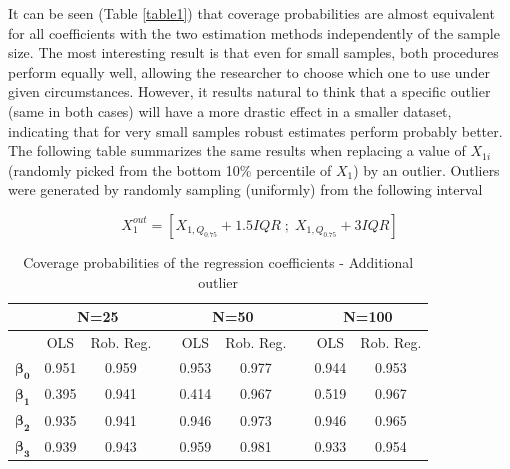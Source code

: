 \documentclass[a4paper]{article}
\begin{document}
\noindent
It can be seen (Table \ref{table1}) that coverage probabilities are almost equivalent for all coefficients with the two estimation methods independently of the sample size. The most interesting result is that even for small samples, both procedures perform equally well, allowing the researcher to choose which one to use under given circumstances. However, it results natural to think that a specific outlier (same in both cases) will have a more drastic effect in a smaller dataset, indicating that for very small samples robust estimates perform probably better. The following table summarizes the same results when replacing a value of $X_{1i}$ (randomly picked from the bottom 10\% percentile of $X_1$) by an outlier. Outliers were generated by randomly sampling (uniformly) from the following interval

\vspace{3mm}
\begin{equation*}
X_{1}^{out}=\left[X_{1,Q_{0.75}}+1.5IQR\; ; \; X_{1,Q_{0.75}}+3IQR \right]
\end{equation*}

\begin{table}[!h]
	\centering
	\caption{Coverage probabilities of the regression coefficients - Additional outlier}
	\vspace{1mm}
	\label{table2}
	\begin{tabular}{@{}ccccccccc@{}}
		\toprule
		& \multicolumn{2}{c}{N=25} & \textit{} & \multicolumn{2}{c}{N=50} & \textit{} & \multicolumn{2}{c}{N=100} \\ \midrule
		& OLS       & Rob. Reg.    & \textit{} & OLS       & Rob. Reg.    & \textit{} & OLS       & Rob. Reg.     \\
		$\mathbf{\beta_{0}}$ & 0.951                 & 0.959                       &           & 0.953                 & 0.977                       &           & 0.944                 & 0.953                       \\
		$\mathbf{\beta_{1}}$ & 0.395                & 0.941                       &           & 0.414                 & 0.967                       &           & 0.519                 & 0.967                       \\
		$\mathbf{\beta_{2}}$ & 0.935                 & 0.941                       &           & 0.946                 & 0.973                       &           & 0.946                  & 0.965                       \\
		$\mathbf{\beta_{3}}$ & 0.939                 & 0.943                       &           & 0.959                 & 0.981                       &           & 0.933                 & 0.954   \\         
		\bottomrule      
	\end{tabular}
\end{table}
\end{document}
